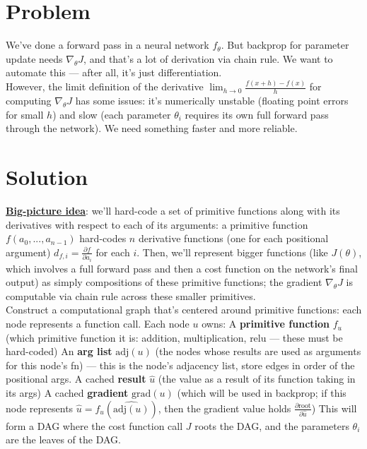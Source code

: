 \documentclass[12pt]{article}
\begin{document}
\pagebreak
\begin{outline}

\section{Problem}

We've done a forward pass in a neural network $f_\theta$. But backprop for parameter update needs $\nabla_\theta J$, and that's a lot of derivation via chain rule. We want to automate this --- after all, it's just differentiation. \\

However, the limit definition of the derivative $\displaystyle \lim_{h \rightarrow 0} \frac{f(x+h)-f(x)}{h}$ for computing $\nabla_\theta J$ has some issues: it's numerically unstable (floating point errors for small $h$) and slow (each parameter $\theta_i$ requires its own full forward pass through the network). We need something faster and more reliable.

\section{Solution}

\underline{\textbf{Big-picture idea}}: we'll hard-code a set of primitive functions along with its derivatives with respect to each of its arguments: a primitive function $f(a_0,...,a_{n-1})$ hard-codes $n$ derivative functions (one for each positional argument) $d_{f,i} = \displaystyle \frac{\partial f}{\partial a_i}$ for each $i$. Then, we'll represent bigger functions (like $J(\theta)$, which involves a full forward pass and then a cost function on the network's final output) as simply compositions of these primitive functions; the gradient $\nabla_\theta J$ is computable via chain rule across these smaller primitives. \\

Construct a computational graph that's centered around primitive functions: each node represents a function call.
\1 Each node $u$ owns:
\2 A \textbf{primitive function} $f_u$ (which primitive function it is: addition, multiplication, relu --- these must be hard-coded)
\2 An \textbf{arg list} $\text{adj}(u)$ (the nodes whose results are used as arguments for this node's fn) --- this is the node's adjacency list, store edges in order of the positional args.
\2 A cached \textbf{result} $\hat{u}$ (the value as a result of its function taking in its args)
\2 A cached \textbf{gradient} $\text{grad}(u)$ (which will be used in backprop; if this node represents $\hat u = f_u(\hat{\text{adj}(u)})$, then the gradient value holds $\displaystyle \frac{\partial \text{root}}{\partial \hat u}$)
\1 This will form a DAG where the cost function call $J$ roots the DAG, and the parameters $\theta_i$ are the leaves of the DAG.
\\\0


\end{outline}
\end{document}
